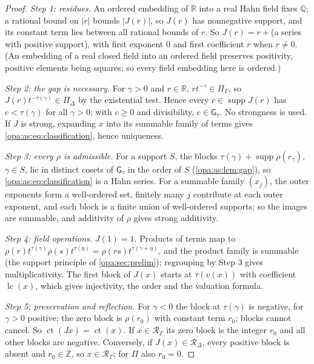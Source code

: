 \documentclass[11pt,oneside]{article}
\numberwithin{equation}{section}
\theoremstyle{definition}
\theoremstyle{remark}
\newcommand{\R}{\mathbb R}
\newcommand{\Q}{\mathbb Q}
\newcommand{\Z}{\mathbb Z}
\newcommand{\supp}{\operatorname{supp}}
\newcommand{\lc}{\operatorname{lc}}
\newcommand{\ct}{\operatorname{ct}}
\newcommand{\gap}{\mathsf G}
\begin{document}
\begin{proof}
\emph{Step 1: residues.} An ordered embedding of $\R$ into a real Hahn field fixes $\Q$; a
rational bound on $|r|$ bounds $|J(r)|$, so $J(r)$ has nonnegative support, and its constant term
lies between all rational bounds of $r$. So $J(r)=r+{}$(a series with positive support), with
first exponent $0$ and first coefficient $r$ when $r\ne0$. (An embedding of a real closed field
into an ordered field preserves positivity, positive elements being squares; so every field
embedding here is ordered.)

\emph{Step 2: the gap is necessary.} For $\gamma>0$ and $r\in\R$, $rt^{-\gamma}\in\Pi_\Gamma$, so
$J(r)t^{-\tau(\gamma)}\in\Pi_\Delta$ by the existential test. Hence every $c\in\supp J(r)$ has
$c<\tau(\gamma)$ for all $\gamma>0$; with $c\ge0$ and divisibility, $c\in\gap_\tau$. No strongness
is used. If $J$ is strong, expanding $x$ into its summable family of terms gives
\eqref{opa:as:eq:classification}, hence uniqueness.

\emph{Step 3: every $\rho$ is admissible.} For a support $S$, the blocks
$\tau(\gamma)+\supp\rho(r_\gamma)$, $\gamma\in S$, lie in distinct cosets of $\gap_\tau$ in the order
of $S$ (\cref{opa:as:lem:gap}), so \eqref{opa:as:eq:classification} is a Hahn series. For a summable
family $(x_j)$, the outer exponents form a well-ordered set, finitely many $j$ contribute at each
outer exponent, and each block is a finite union of well-ordered supports; so the images are
summable, and additivity of $\rho$ gives strong additivity.

\emph{Step 4: field operations.} $J(1)=1$. Products of terms map to
$\rho(r)t^{\tau(\gamma)}\rho(s)t^{\tau(\eta)}=\rho(rs)t^{\tau(\gamma+\eta)}$, and the product family is
summable (the support principle of \cref{opa:sec:prelim}); regrouping by Step 3 gives
multiplicativity. The first block of $J(x)$ starts at $\tau(v(x))$ with coefficient $\lc(x)$, which
gives injectivity, the order and the valuation formula.

\emph{Step 5: preservation and reflection.} For $\gamma<0$ the block at $\tau(\gamma)$ is negative, for
$\gamma>0$ positive; the zero block is $\rho(r_0)$ with constant term $r_0$; blocks cannot cancel. So
$\ct(Jx)=\ct(x)$. If $x\in\mathcal R_\Gamma$ its zero block is the integer $r_0$ and all other
blocks are negative. Conversely, if $J(x)\in\mathcal R_\Delta$, every positive block is absent and
$r_0\in\Z$, so $x\in\mathcal R_\Gamma$; for $\Pi$ also $r_0=0$.
\end{proof}
\end{document}
